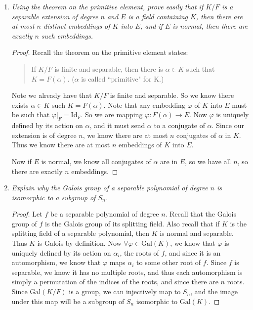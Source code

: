 \documentclass[9pt,reqno,twoside]{amsbook}
\theoremstyle{plain}
\numberwithin{section}{chapter}
\numberwithin{equation}{chapter}
\theoremstyle{definition}
\theoremstyle{remark}
\theoremstyle{plain}
\newcommand{\bb}{\vspace{3mm}}
\newcommand{\gal}{\mathrm{Gal}}
\renewcommand{\phi}{\varphi}
\begin{document}
\begin{enumerate}[label=\arabic*.]

\item \textit{Using the theorem on the primitive element, prove easily that if $K/F$ is a separable extension of degree $n$ and $E$ is a field containing $K$, then there are at most $n$ distinct embeddings of $K$ into $E$, and if $E$ is normal, then there are exactly $n$ such embeddings. }

\begin{proof}
Recall the theorem on the primitive element states: 
\bb

\begin{quotation}
If $K/F$ is finite and separable, then there is $\alpha \in K$ such that $K = F(\alpha)$. ($\alpha$ is called ``primitive" for K.)
\end{quotation}
\bb


Note we already have that $K/F$ is finite and separable. So we know there exists $\alpha \in K$ such $K = F(\alpha)$. Note that any embedding $\phi$ of $K$ into $E$ must be such that $\phi|_F = \mathrm{Id}_F$. So we are mapping $\phi:F(\alpha) \to E$. Now $\phi$ is uniquely defined by its action on $\alpha$, and it must send $\alpha$ to a conjugate of $\alpha$. Since our extension is of degree $n$, we know there are at most $n$ conjugates of $\alpha$ in $K$. Thus we know there are at most $n$ embeddings of $K$ into $E$. 

\bb
Now if $E$ is normal, we know all conjugates of $\alpha$ are in $E$, so we have all $n$, so there are exactly $n$ embeddings. 
\end{proof}

\bb

\item \textit{Explain why the Galois group of a separable polynomial of degree $n$ is isomorphic to a subgroup of $S_n$. }

\begin{proof}
Let $f$ be a separable polynomial of degree $n$. Recall that the Galois group of $f$ is the Galois group of its splitting field. Also recall that if $K$ is the splitting field of a separable polynomial, then $K$ is normal and separable. Thus $K$ is Galois by definition. Now $\forall \phi \in \gal(K)$, we know that $\phi$ is uniquely defined by its action on $\alpha_i$, the roots of $f$, and since it is an automorphism, we know that $\phi$ maps $\alpha_i$ to some other root of $f$. Since $f$ is separable, we know it has no multiple roots, and thus each automorphism is simply a permutation of the indices of the roots, and since there are $n$ roots. Since $\gal(K/F)$ is a group, we can injectively map to $S_n$, and the image under this map will be a subgroup of $S_n$ isomorphic to $\gal(K)$. 
\end{proof}


\end{enumerate}
\end{document}
